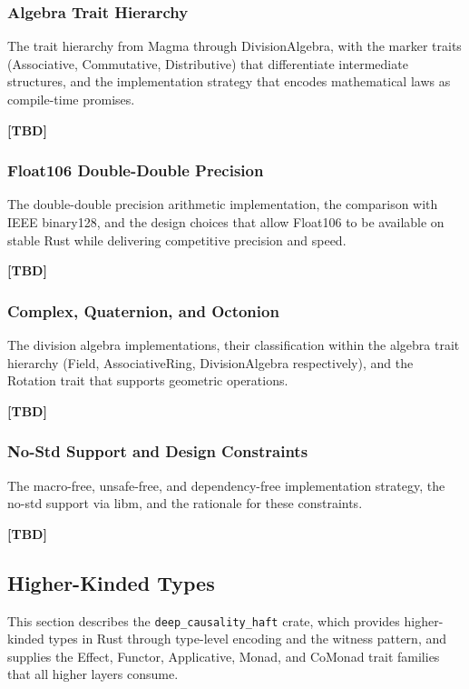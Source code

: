 \subsubsection{Algebra Trait Hierarchy}
The trait hierarchy from Magma through DivisionAlgebra, with the marker traits (Associative, Commutative, Distributive) that differentiate intermediate structures, and the implementation strategy that encodes mathematical laws as compile-time promises.
 
\textbf{[TBD]}
 
\subsubsection{Float106 Double-Double Precision}
The double-double precision arithmetic implementation, the comparison with IEEE binary128, and the design choices that allow Float106 to be available on stable Rust while delivering competitive precision and speed.
 
\textbf{[TBD]}
 
\subsubsection{Complex, Quaternion, and Octonion}
The division algebra implementations, their classification within the algebra trait hierarchy (Field, AssociativeRing, DivisionAlgebra respectively), and the Rotation trait that supports geometric operations.
 
\textbf{[TBD]}
 
\subsubsection{No-Std Support and Design Constraints}
The macro-free, unsafe-free, and dependency-free implementation strategy, the no-std support via libm, and the rationale for these constraints.
 
\textbf{[TBD]}
 
 
\subsection{Higher-Kinded Types}
\label{sec:implementation_haft}
 
This section describes the \texttt{deep\_causality\_haft} crate, which provides higher-kinded types in Rust through type-level encoding and the witness pattern, and supplies the Effect, Functor, Applicative, Monad, and CoMonad trait families that all higher layers consume.
 
